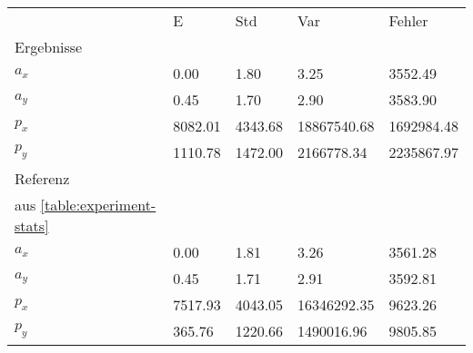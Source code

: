\begin{tabular}{l|l|l|l|l}

     & E   & Std    & Var    & Fehler \\
\hhline{=|=|=|=|=}

Ergebnisse & & & & \\
$a_x$  &         0.00 &         1.80 &         3.25 &      3552.49 \\
$a_y$  &         0.45 &         1.70 &         2.90 &      3583.90 \\
$p_x$  &      8082.01 &      4343.68 &  18867540.68 &   1692984.48 \\
$p_y$  &      1110.78 &      1472.00 &   2166778.34 &   2235867.97 \\

\hline
Referenz & & & & \\
aus \ref{table:experiment-stats} & & & & \\
$a_x$  &         0.00 &         1.81 &         3.26 &      3561.28 \\
$a_y$  &         0.45 &         1.71 &         2.91 &      3592.81 \\
$p_x$  &      7517.93 &      4043.05 &  16346292.35 &      9623.26 \\
$p_y$  &       365.76 &      1220.66 &   1490016.96 &      9805.85 \\
\end{tabular}
